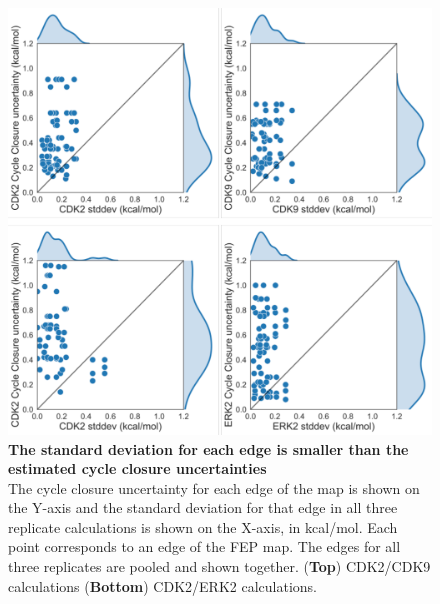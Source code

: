 \documentclass[9pt,lineno]{elife-modified} %
\begin{document}
\begin{figure}[h]
	\begin{fullwidth}
		\begin{centering}
			\includegraphics[width=1.0\linewidth]{figures/supp_figure9.pdf}
		\end{centering}
		\caption{
			\label{fig:sup-figure-9}
		{\bf The standard deviation for each edge is smaller than the estimated cycle closure uncertainties} \\
		The cycle closure uncertainty for each edge of the map is shown on the Y-axis and the standard deviation for that edge in all three replicate calculations is shown on the X-axis, in kcal/mol. Each point corresponds to an edge of the FEP map. The edges for all three replicates are pooled and shown together.  ({\bf Top}) CDK2/CDK9 calculations ({\bf Bottom}) CDK2/ERK2 calculations. 
}
	\end{fullwidth}
\end{figure}
\end{document}
